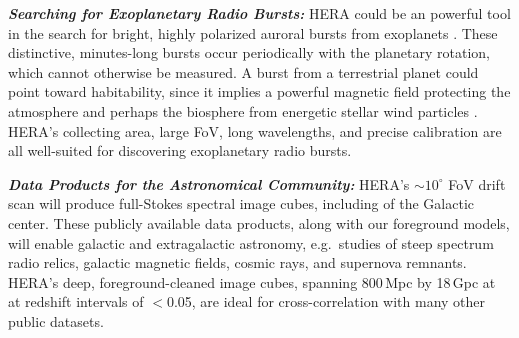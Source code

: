 \documentclass[preprint,11pt]{aastex}
\begin{document}
\noindent \textbf{\textit{Searching for Exoplanetary Radio Bursts: }}
HERA could be an powerful tool in the search for bright, highly polarized auroral bursts
from exoplanets %
\citep{treumann2006,hallinan_et_al2015}. These
distinctive, minutes-long  bursts occur periodically with the planetary
rotation, which cannot otherwise be measured.
A burst from a terrestrial planet could point toward
habitability, since it implies a powerful magnetic field
protecting the atmosphere and perhaps the biosphere from energetic stellar wind
particles \citep{tarter_et_al2007}. HERA's collecting area, large FoV, long wavelengths, and precise calibration are all well-suited
for discovering exoplanetary radio bursts.

\noindent \textbf{\textit{Data Products for the Astronomical Community:}} 
HERA's $\sim 10^\circ$ FoV drift scan will produce full-Stokes spectral image cubes, including of the Galactic center.
These publicly available data products, along with our foreground models, will 
enable galactic and extragalactic astronomy, e.g.\ studies of steep spectrum radio
relics, galactic magnetic fields, cosmic rays, and supernova remnants.
HERA's deep, foreground-cleaned image cubes, spanning 800\,Mpc by 18\,Gpc at at redshift intervals of $<$0.05, are ideal for cross-correlation with many other public datasets.

\end{document}
